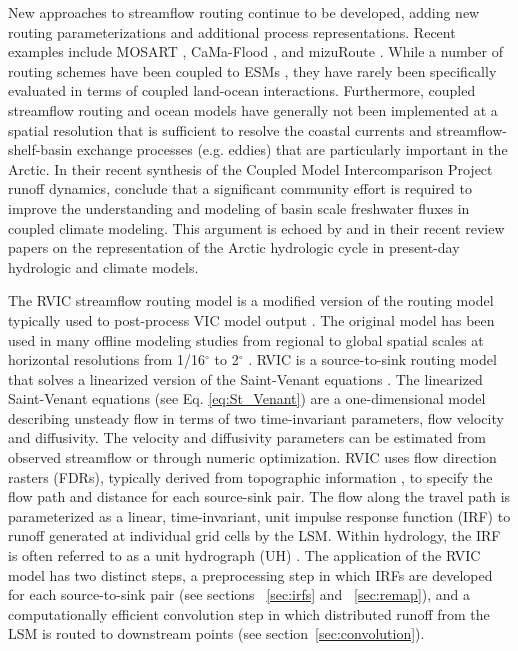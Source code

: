 \documentclass[jgrga, draft]{agutex}
\begin{document}
\begin{article}
New approaches to streamflow routing continue to be developed, adding new routing parameterizations and additional process representations.
Recent examples include MOSART \citep{Li_2013}, CaMa-Flood \citep{Yamazaki_2009,Yamazaki_2014}, and mizuRoute \citep{Clark_2016}.
While a number of routing schemes have been coupled to ESMs \citep[e.g.][]{Sushama_2004,Olivera_2000,Li_2013}, they have rarely been specifically evaluated in terms of coupled land-ocean interactions.
Furthermore, coupled streamflow routing and ocean models have generally not been implemented at a spatial resolution that is sufficient to resolve the coastal currents and streamflow-shelf-basin exchange processes (e.g. eddies) that are particularly important in the Arctic.
In their recent synthesis of the Coupled Model Intercomparison Project \citep[CMIP5; ][]{Taylor_2012} runoff dynamics, \citet{Bring_2015} conclude that a significant community effort is required to improve the understanding and modeling of basin scale freshwater fluxes in coupled climate modeling.
This argument is echoed by \citet{Lique_2015} and \citet{Bring_2016} in their recent review papers on the representation of the Arctic hydrologic cycle in present-day hydrologic and climate models.

The RVIC streamflow routing model is a modified version of the routing model typically used to post-process VIC model output \citep{Lohmann_1996, Lohmann_1998a}.
The original \citet{Lohmann_1996} model has been used in many offline modeling studies from regional to global spatial scales at horizontal resolutions from 1/16$^{\circ}$ to 2$^{\circ}$ \citep[e.g.][]{Nijssen_1997,Lohmann_1998b,Su_2005,Hamlet_2013}.
RVIC is a source-to-sink routing model that solves a linearized version of the Saint-Venant equations \citep{Fread_1992,Mesa_1986}.
The linearized Saint-Venant equations (see Eq. \ref{eq:St_Venant}) are a one-dimensional model describing unsteady flow in terms of two time-invariant parameters, flow velocity and diffusivity.
The velocity and diffusivity parameters can be estimated from observed streamflow or through numeric optimization.
RVIC uses flow direction rasters (FDRs), typically derived from topographic information \citep[e.g.][]{Wu_2011}, to specify the flow path and distance for each source-sink pair.
The flow along the travel path is parameterized as a linear, time-invariant, unit impulse response function (IRF) to runoff generated at individual grid cells by the LSM.
Within hydrology, the IRF is often referred to as a unit hydrograph (UH) \citep[e.g.][]{Sherman_1932,Nash_1957}.
The application of the RVIC model has two distinct steps, a preprocessing step in which IRFs are developed for each source-to-sink pair (see sections ~\ref{sec:irfs} and ~\ref{sec:remap}), and a computationally efficient convolution step in which distributed runoff from the LSM is routed to downstream points (see section~\ref{sec:convolution}).


\end{article}
\end{document}
